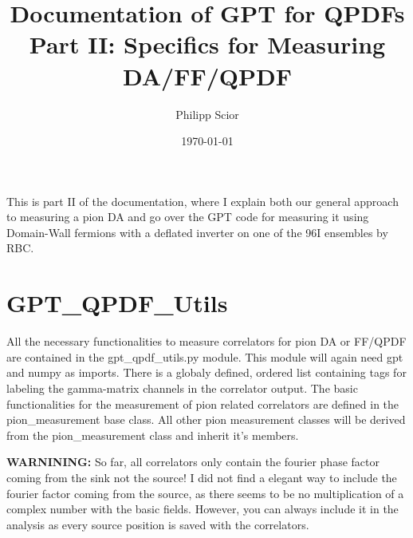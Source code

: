 \documentclass[a4paper,10pt]{scrartcl}
\title{Documentation of GPT for QPDFs \newline Part II: Specifics for Measuring DA/FF/QPDF}
\author{Philipp Scior}
\date{\today}
\begin{document}
\maketitle

This is part II of the documentation, where I explain both our general approach to measuring a pion DA and go over the GPT code for measuring it
using Domain-Wall fermions with a deflated inverter on one of the 96I ensembles by RBC.

\section{GPT\_QPDF\_Utils}
All the necessary functionalities to measure correlators for pion DA or FF/QPDF are contained in the 
gpt\_qpdf\_utils.py module. This module will again need gpt and numpy as imports. There is a globaly defined,
ordered list containing tags for labeling the gamma-matrix channels in the correlator output. \newline
The basic functionalities for the measurement of pion related correlators are defined in the pion\_measurement
base class. All other pion measurement classes will be derived from the pion\_measurement class and inherit it's
members.

\textbf{WARNINING:} So far, all correlators only contain the fourier phase factor coming from the sink not the source! I did not find a elegant way to include the
fourier factor coming from the source, as there seems to be no multiplication of a complex number with the basic fields. However, you can always include it in the 
analysis as every source position is saved with the correlators.
\end{document}

